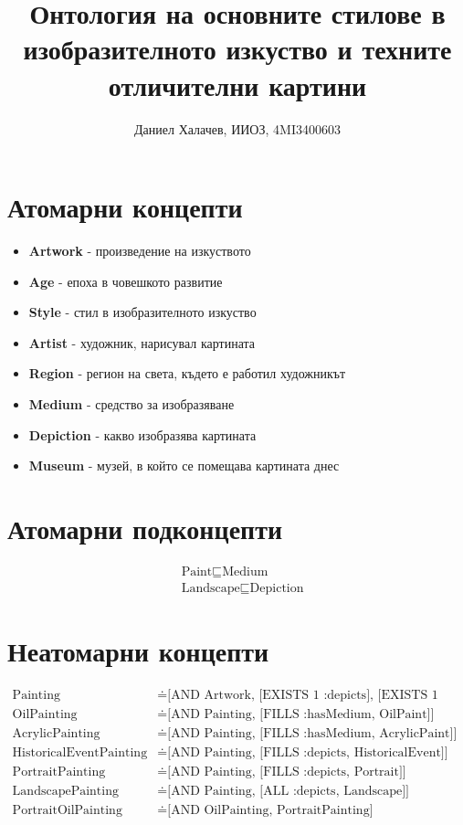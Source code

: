 \documentclass{article}
\begin{document}
\author{Даниел Халачев, ИИОЗ, 4MI3400603}
\title{Онтология на основните стилове в изобразителното изкуство и техните отличителни картини}
\maketitle

\section*{Атомарни концепти}
\begin{itemize}
  \item \textbf{Artwork} - произведение на изкуството
  \item \textbf{Age} - епоха в човешкото развитие
  \item \textbf{Style} - стил в изобразителното изкуство
  \item \textbf{Artist} - художник, нарисувал картината
  \item \textbf{Region} - регион на света, където е работил художникът
  \item \textbf{Medium} - средство за изобразяване
  \item \textbf{Depiction} - какво изобразява картината
  \item \textbf{Museum} - музей, в който се помещава картината днес
\end{itemize}

\section*{Атомарни подконцепти}
\begin{align*}
  &\text{Paint} \sqsubseteq \text{Medium} \\
  &\text{Landscape} \sqsubseteq \text{Depiction}
\end{align*}

\section*{Неатомарни концепти}
\begin{align*}
  \text{Painting} &\doteq \text{[AND Artwork, [EXISTS 1 :depicts], [EXISTS 1 :hasMedium]]} \\
  \text{OilPainting} &\doteq \text{[AND Painting, [FILLS :hasMedium, OilPaint]]} \\
  \text{AcrylicPainting} &\doteq \text{[AND Painting, [FILLS :hasMedium, AcrylicPaint]]} \\
  \text{HistoricalEventPainting} &\doteq \text{[AND Painting, [FILLS :depicts, HistoricalEvent]]} \\
  \text{PortraitPainting} &\doteq \text{[AND Painting, [FILLS :depicts, Portrait]]} \\
  \text{LandscapePainting} &\doteq \text{[AND Painting, [ALL :depicts, Landscape]]} \\
  \text{PortraitOilPainting} &\doteq \text{[AND OilPainting, PortraitPainting]}
\end{align*}
\end{document}
